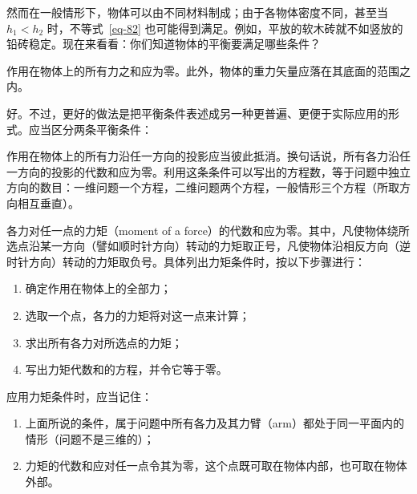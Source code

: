 \begin{dialogue}
然而在一般情形下，物体可以由不同材料制成；由于各物体密度不同，甚至当 $h_{1}<h_{2}$ 时，不等式~\eqref{eq-82} 也可能得到满足。例如，平放的软木砖就不如竖放的铅砖稳定。现在来看看：你们知道物体的平衡要满足哪些条件？

\stda 作用在物体上的所有力之和应为零。此外，物体的重力矢量应落在其底面的范围之内。

\tchr 好。不过，更好的做法是把平衡条件表述成另一种更普遍、更便于实际应用的形式。应当区分两条平衡条件：
\begin{description}[leftmargin=1cm,font=\bfseries]
\item[第一个条件：] 作用在物体上的所有力沿任一方向的投影应当彼此抵消。换句话说，所有各力沿任一方向的投影的代数和应为零。利用这条条件可以写出的方程数，等于问题中独立方向的数目：一维问题一个方程，二维问题两个方程，一般情形三个方程（所取方向相互垂直）。

\item[第二个条件（力矩条件）：] 各力对任一点的力矩（moment of a force）的代数和应为零。其中，凡使物体绕所选点沿某一方向（譬如顺时针方向）转动的力矩取正号，凡使物体沿相反方向（逆时针方向）转动的力矩取负号。具体列出力矩条件时，按以下步骤进行：
\begin{enumerate}[label=(\alph*), leftmargin=1cm]
 \item 确定作用在物体上的全部力；
 \item 选取一个点，各力的力矩将对这一点来计算；
\item 求出所有各力对所选点的力矩；
 \item 写出力矩代数和的方程，并令它等于零。
 \end{enumerate}
\end{description}
 应用力矩条件时，应当记住：
\begin{enumerate}[label=(\arabic*), leftmargin=1cm]
\item 上面所说的条件，属于问题中所有各力及其力臂（arm）都处于同一平面内的情形（问题不是三维的）；
\item 力矩的代数和应对任一点令其为零，这个点既可取在物体内部，也可取在物体外部。
\end{enumerate}


\end{dialogue}
